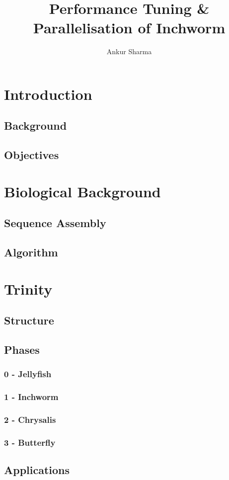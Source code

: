 \documentclass[plainarticle,zihtitle,english,final,hyperref,utf8]{zihpub}
\author{Ankur Sharma}
\title{Performance Tuning \& Parallelisation of Inchworm}
\begin{document}
\section{Introduction}
\subsection{Background}
\subsection{Objectives}
\section{Biological Background}
\subsection{Sequence Assembly}
\subsection{Algorithm}

\section{Trinity}
\subsection{Structure}
\subsection{Phases}
\subsubsection{0 - Jellyfish}
\subsubsection{1 - Inchworm}
\subsubsection{2 - Chrysalis}
\subsubsection{3 - Butterfly}
\subsection{Applications}
\end{document}
